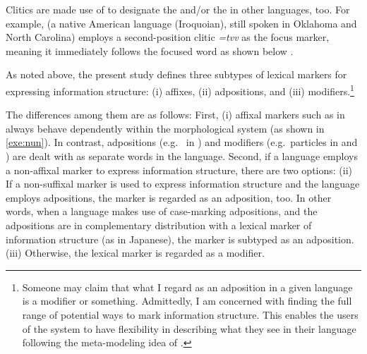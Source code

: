 \noindent Clitics are made use of to designate the  and/or the
 in other languages, too. For example,  (a native
American language (Iroquoian), still spoken in Oklahoma and North
Carolina) employs a second-position clitic \textit{=tvv} as the focus
marker, meaning it immediately follows the focused word as shown below
\citep{montgomery:08}.




As noted above, the present study defines three subtypes of lexical
markers for expressing information structure: (i) affixes, (ii)
adpositions, and (iii) modifiers.\footnote{Someone may
  claim that what I regard as an adposition in a given language is a
  modifier or something. Admittedly, I am concerned with finding the
  full range of potential ways to mark information structure. This
  enables the users of the \lingo {} system to have
  flexibility in describing what they see in their language following
  the meta-modeling idea of \citet{poulson:11}.}




The differences among them are as follows: First, (i) affixal markers
such as \nun in  always behave dependently within the
morphological system (as shown in \ref{exe:nun}). In contrast,
adpositions (e.g.\  in
) and modifiers (e.g.\ particles in 
 and ) are dealt
with as separate words in the language. Second, if a language employs
a non-affixal marker to express information structure, there are two
options: (ii) If a non-suffixal marker is used to express information
structure and the language employs adpositions, the marker is regarded
as an adposition, too. In other words, when a language makes use of
case-marking adpositions, and the adpositions are in complementary
distribution with a lexical marker of information structure (as in
Japanese), the marker is subtyped as an adposition. (iii) Otherwise, the lexical marker is regarded as a
modifier.



